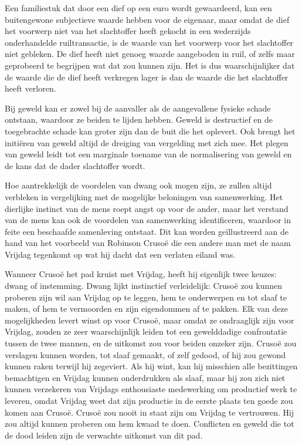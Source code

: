 Een familiestuk dat door een dief op een euro wordt gewaardeerd, kan een buitengewone subjectieve waarde hebben voor de eigenaar, maar omdat de dief het voorwerp niet van het slachtoffer heeft gekocht in een wederzijds onderhandelde ruiltransactie, is de waarde van het voorwerp voor het slachtoffer niet gebleken. De dief heeft niet genoeg waarde aangeboden in ruil, of zelfs maar geprobeerd te begrijpen wat dat zou kunnen zijn. Het is dus waarschijnlijker dat de waarde die de dief heeft verkregen lager is dan de waarde die het slachtoffer heeft verloren.

Bij geweld kan er zowel bij de aanvaller als de aangevallene fysieke schade ontstaan, waardoor ze beiden te lijden hebben. Geweld is destructief en de toegebrachte schade kan groter zijn dan de buit die het oplevert. Ook brengt het initiëren van geweld altijd de dreiging van vergelding met zich mee. Het plegen van geweld leidt tot een marginale toename van de normalisering van geweld en de kans dat de dader slachtoffer wordt.

Hoe aantrekkelijk de voordelen van dwang ook mogen zijn, ze zullen altijd verbleken in vergelijking met de mogelijke beloningen van samenwerking. Het dierlijke instinct van de mens roept angst op voor de ander, maar het verstand van de mens kan ook de voordelen van samenwerking identificeren, waardoor in feite een beschaafde samenleving ontstaat. Dit kan worden geïllustreerd aan de hand van het voorbeeld van Robinson Crusoë die een andere man met de naam Vrijdag tegenkomt op wat hij dacht dat een verlaten eiland was.

Wanneer Crusoë het pad kruist met Vrijdag, heeft hij eigenlijk twee keuzes: dwang of instemming. Dwang lijkt instinctief verleidelijk: Crusoë zou kunnen proberen zijn wil aan Vrijdag op te leggen, hem te onderwerpen en tot slaaf te maken, of hem te vermoorden en zijn eigendommen af te pakken. Elk van deze mogelijkheden levert winst op voor Crusoë, maar omdat ze ondraaglijk zijn voor Vrijdag, zouden ze zeer waarschijnlijk leiden tot een gewelddadige confrontatie tussen de twee mannen, en de uitkomst zou voor beiden onzeker zijn. Crusoë zou verslagen kunnen worden, tot slaaf gemaakt, of zelf gedood, of hij zou gewond kunnen raken terwijl hij zegeviert. Als hij wint, kan hij misschien alle bezittingen bemachtigen en Vrijdag kunnen onderdrukken als slaaf, maar hij zou zich niet kunnen verzekeren van Vrijdags enthousiaste medewerking om productief werk te leveren, omdat Vrijdag weet dat zijn productie in de eerste plaats ten goede zou komen aan Crusoë. Crusoë zou nooit in staat zijn om Vrijdag te vertrouwen. Hij zou altijd kunnen proberen om hem kwaad te doen. Conflicten en geweld die tot de dood leiden zijn de verwachte uitkomst van dit pad.

